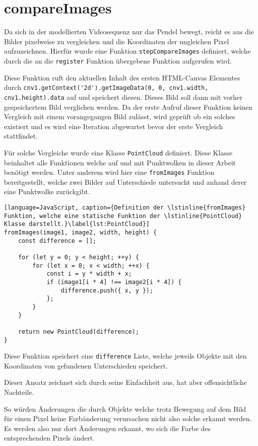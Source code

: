\section{compareImages}

Da sich in der modellierten Videosequenz nur das Pendel bewegt, reicht es aus die Bilder pixelweise zu vergleichen und die Koordinaten der ungleichen Pixel aufzuzeichnen.
Hierfür wurde eine Funktion \lstinline{stepCompareImages} definiert, welche durch die an die \lstinline{register} Funktion übergebene Funktion aufgerufen wird.

Diese Funktion ruft den aktuellen Inhalt des ersten HTML-Canvas Elementes durch \lstinline{cnv1.getContext('2d').getImageData(0, 0, cnv1.width, cnv1.height).data} auf und speichert diesen.
Dieses Bild soll dann mit vorher gespeichertem Bild verglichen werden.
Da der erste Aufruf dieser Funktion keinen Vergleich mit einem vorangegangen Bild zulässt, wird geprüft ob ein solches existiert und es wird eine Iteration abgewartet bevor der erste Vergleich stattfindet.

Für solche Vergleiche wurde eine Klasse \lstinline{PointCloud} definiert.
Diese Klasse beinhaltet alle Funktionen welche auf und mit Punktwolken in dieser Arbeit benötigt werden.
Unter anderem wird hier eine \lstinline{fromImages} Funktion bereitgestellt, welche zwei Bilder auf Unterschiede untersucht und anhand derer eine Punktwolke zurückgibt.

\begin{lstlisting}[language=JavaScript, caption={Definition der \lstinline{fromImages} Funktion, welche eine statische Funktion der \lstinline{PointCloud} Klasse darstellt.}\label{lst:PointCloud}]
fromImages(image1, image2, width, height) {
    const difference = [];

    for (let y = 0; y < height; ++y) {
        for (let x = 0; x < width; ++x) {
            const i = y * width + x;
            if (image1[i * 4] !== image2[i * 4]) {
                difference.push({ x, y });
            };
        }
    }

    return new PointCloud(difference);
}
\end{lstlisting}

Diese Funktion speichert eine \lstinline{difference} Liste, welche jeweils Objekte mit den Koordinaten von gefundenen Unterschieden speichert.

Dieser Ansatz zeichnet sich durch seine Einfachheit aus, hat aber offensichtliche Nachteile.

So würden Änderungen die durch Objekte welche trotz Bewegung auf dem Bild für einen Pixel keine Farbänderung verursachen nicht also solche erkannt werden.
Es werden also nur dort Änderungen erkannt, wo sich die Farbe des entsprechenden Pixels ändert.

